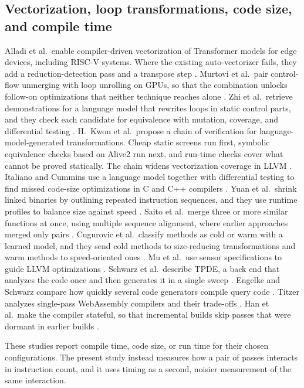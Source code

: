 \subsection{Vectorization, loop transformations, code size, and compile time}

Alladi et al.\ enable compiler-driven vectorization of Transformer models for edge devices, including RISC-V systems. Where the existing auto-vectorizer fails, they add a reduction-detection pass and a transpose step \cite{alladi2026enabling}. Murtovi et al.\ pair control-flow unmerging with loop unrolling on GPUs, so that the combination unlocks follow-on optimizations that neither technique reaches alone \cite{murtovi2024enhancing}. Zhi et al.\ retrieve demonstrations for a language model that rewrites loops in static control parts, and they check each candidate for equivalence with mutation, coverage, and differential testing \cite{zhi2026looprag}. H.\ Kwon et al.\ propose a chain of verification for language-model-generated transformations. Cheap static screens run first, symbolic equivalence checks based on Alive2 \cite{lopes2021alive2} run next, and run-time checks cover what cannot be proved statically. The chain widens vectorization coverage in LLVM \cite{kwon2026compiler}. Italiano and Cummins use a language model together with differential testing to find missed code-size optimizations in C and C++ compilers \cite{italiano2025finding}. Yuan et al.\ shrink linked binaries by outlining repeated instruction sequences, and they use runtime profiles to balance size against speed \cite{yuan2025post}. Saito et al.\ merge three or more similar functions at once, using multiple sequence alignment, where earlier approaches merged only pairs \cite{saito2025multiple}. Cugurovic et al.\ classify methods as cold or warm with a learned model, and they send cold methods to size-reducing transformations and warm methods to speed-oriented ones \cite{cugurovic2026graalmhc}. Mu et al.\ use sensor specifications to guide LLVM optimizations \cite{mu2024cosense}. Schwarz et al.\ describe TPDE, a back end that analyzes the code once and then generates it in a single sweep \cite{schwarz2026tpde}. Engelke and Schwarz compare how quickly several code generators compile query code \cite{engelke2024compile}. Titzer analyzes single-pass WebAssembly compilers and their trade-offs \cite{titzer2024whose}. Han et al.\ make the compiler stateful, so that incremental builds skip passes that were dormant in earlier builds \cite{han2024enabling}.

These studies report compile time, code size, or run time for their chosen configurations. The present study instead measures how a pair of passes interacts in instruction count, and it uses timing as a second, noisier measurement of the same interaction.

